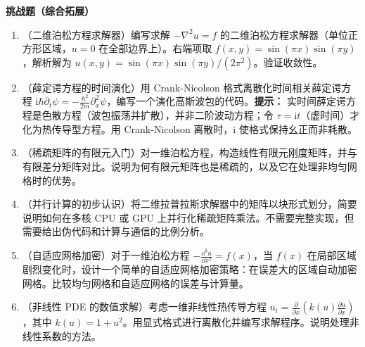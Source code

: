 \textbf{挑战题（综合拓展）}

\begin{enumerate}
\item[13.]（二维泊松方程求解器）编写求解 $-\nabla^2 u = f$ 的二维泊松方程求解器（单位正方形区域，$u=0$ 在全部边界上）。右端项取 $f(x,y)=\sin(\pi x)\sin(\pi y)$，解析解为 $u(x,y)=\sin(\pi x)\sin(\pi y)/(2\pi^2)$。验证收敛性。
\item[14.]（薛定谔方程的时间演化）用 Crank-Nicolson 格式离散化时间相关薛定谔方程 $\mathrm{i}\hbar\partial_t\psi = -\frac{\hbar^2}{2m}\partial_x^2\psi$，编写一个演化高斯波包的代码。\textbf{提示：} 实时间薛定谔方程是色散方程（波包振荡并扩散），并非二阶波动方程；令 $\tau=\mathrm{i}t$（虚时间）才化为热传导型方程。用 Crank-Nicolson 离散时，$\mathrm{i}$ 使格式保持幺正而非耗散。
\item[15.]（稀疏矩阵的有限元入门）对一维泊松方程，构造线性有限元刚度矩阵，并与有限差分矩阵对比。说明为何有限元矩阵也是稀疏的，以及它在处理非均匀网格时的优势。
\item[16.]（并行计算的初步认识）将二维拉普拉斯求解器中的矩阵以块形式划分，简要说明如何在多核 CPU 或 GPU 上并行化稀疏矩阵乘法。不需要完整实现，但需要给出伪代码和计算与通信的比例分析。
\item[17.]（自适应网格加密）对于一维泊松方程 $-\frac{\dd^2 u}{\dd x^2}=f(x)$，当 $f(x)$ 在局部区域剧烈变化时，设计一个简单的自适应网格加密策略：在误差大的区域自动加密网格。比较均匀网格和自适应网格的误差与计算量。
\item[18.]（非线性 PDE 的数值求解）考虑一维非线性热传导方程 $u_t = \frac{\partial}{\partial x}\left(k(u)\frac{\partial u}{\partial x}\right)$，其中 $k(u) = 1 + u^2$。用显式格式进行离散化并编写求解程序。说明处理非线性系数的方法。
\end{enumerate}
